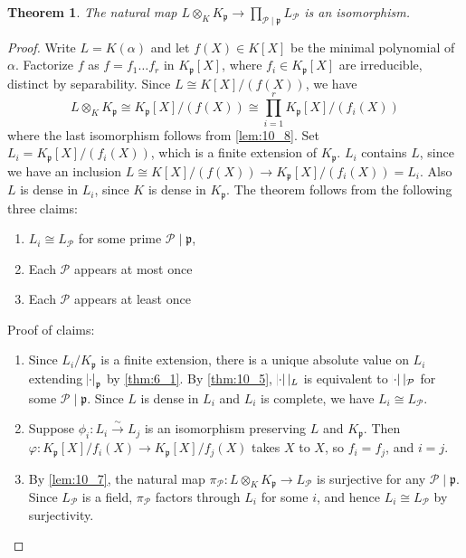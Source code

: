 \documentclass[11pt]{article}
\theoremstyle{definition}
\theoremstyle{plain}
\newtheorem{theorem}[definition]{Theorem}
\theoremstyle{remark}
\newcommand{\cP}{\mathcal{P}}
\newcommand{\fp}{\mathfrak{p}}
\begin{document}
\begin{theorem}\label{thm:10_9}
    The natural map $L \otimes_K K_\fp \to \prod_{\cP \mid \fp} L_\cP$ is an isomorphism.
\end{theorem}
\begin{proof}
    Write $L = K(\alpha)$ and let $f(X) \in K[X]$ be the minimal polynomial of $\alpha$. Factorize $f$ as $f = f_1 \ldots f_r$ in $K_\fp[X]$, where $f_i \in K_\fp[X]$ are irreducible, distinct by separability. Since $L \cong K[X] / (f(X))$, we have
    \begin{equation*}
        L \otimes_K K_\fp \cong K_\fp[X]/(f(X)) \cong \prod_{i=1}^r K_\fp[X]/(f_i(X))
    \end{equation*}
    where the last isomorphism follows from \autoref{lem:10_8}. Set $L_i = K_\fp[X] / (f_i(X))$, which is a finite extension of $K_\fp$. $L_i$ contains $L$, since we have an inclusion $L \cong K[X] / (f(X)) \to K_\fp[X] / (f_i(X)) = L_i$. Also $L$ is dense in $L_i$, since $K$ is dense in $K_\fp$. The theorem follows from the following three claims:
    \begin{enumerate}
        \item $L_i \cong L_\cP$ for some prime $\cP \mid \fp$,
        \item Each $\cP$ appears at most once
        \item Each $\cP$ appears at least once
    \end{enumerate}
    Proof of claims:
    \begin{enumerate}
        \item Since $L_i/K_\fp$ is a finite extension, there is a unique absolute value on $L_i$ extending $\abs{\cdot}_\fp$ by \autoref{thm:6_1}. By \autoref{thm:10_5}, $\abs{\cdot} \vert_L$ is equivalent to $\abs{\cdot} \vert_\cP$ for some $\cP \mid \fp$. Since $L$ is dense in $L_i$ and $L_i$ is complete, we have $L_i \cong L_\cP$.
        \item Suppose $\phi_i : L_i \xrightarrow{\sim} L_j$ is an isomorphism preserving $L$ and $K_\fp$. Then $\varphi : K_\fp[X] / f_i(X) \to K_\fp[X] / f_j(X)$ takes $X$ to $X$, so $f_i = f_j$, and $i = j$.
        \item By \autoref{lem:10_7}, the natural map $\pi_\cP : L \otimes_K K_\fp \to L_\cP$ is surjective for any $\cP \mid \fp$. Since $L_\cP$ is a field, $\pi_\cP$ factors through $L_i$ for some $i$, and hence $L_i \cong L_\cP$ by surjectivity. \qedhere
    \end{enumerate}
\end{proof}
\end{document}
